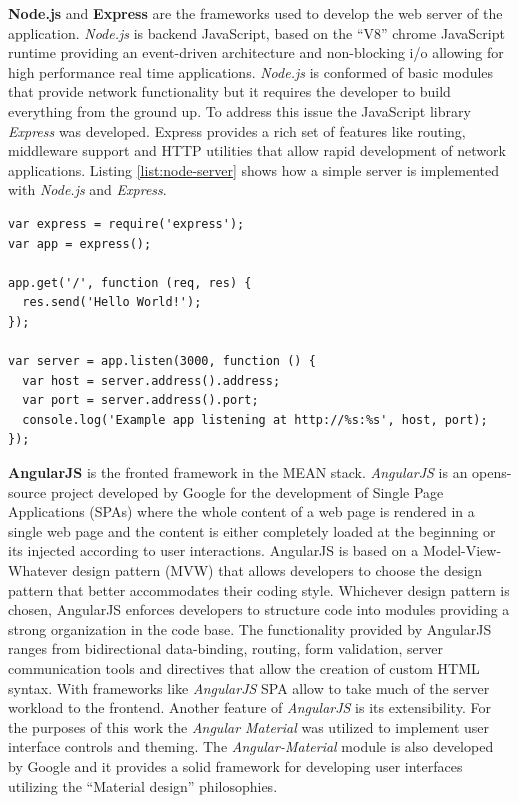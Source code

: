 \documentclass[../medieninformatik-arbeit.tex]{subfiles}
\begin{document}
\textbf{Node.js}\cite{joyent2015node} and \textbf{Express}\cite{express} are the frameworks used to develop the web server of the application. \textit{Node.js} is backend JavaScript, based on the ``V8'' chrome JavaScript runtime providing an event-driven architecture and non-blocking i/o allowing for high performance real time applications. \textit{Node.js} is conformed of basic modules that provide network functionality but it requires the developer to build everything from the ground up. To address this issue the JavaScript library \textit{Express} was developed. Express provides a rich set of features like routing, middleware support and HTTP utilities that allow rapid development of network applications. Listing \ref{list:node-server} shows how a simple server is implemented with \textit{Node.js} and \textit{Express}.

\begin{lstlisting}[style=htmlcssjs, caption={Basic \textit{Node.js} and \textit{Express} server example},label=list:node-server]
var express = require('express');
var app = express();

app.get('/', function (req, res) {
  res.send('Hello World!');
});

var server = app.listen(3000, function () {
  var host = server.address().address;
  var port = server.address().port;
  console.log('Example app listening at http://%s:%s', host, port);
});
\end{lstlisting}

\textbf{AngularJS}\cite{angular} is the fronted framework in the MEAN stack. \textit{AngularJS} is an opens-source project developed by Google for the development of Single Page Applications (SPAs) where the whole content of a web page is rendered in a single web page and the content is either completely loaded at the beginning or its injected according to user interactions. AngularJS is based on a Model-View-Whatever design pattern (MVW) that allows developers to choose the design pattern that better accommodates their coding style. Whichever design pattern is chosen, AngularJS enforces developers to structure code into modules providing a strong organization in the code base. The functionality provided by AngularJS ranges from bidirectional data-binding, routing, form validation, server communication tools and directives that allow the creation of custom HTML syntax. With frameworks like \textit{AngularJS} SPA allow to take much of the server workload to the frontend. Another feature of \textit{AngularJS} is its extensibility. For the purposes of this work the \textit{Angular Material}\cite{angularmaterial} was utilized to implement user interface controls and theming. The \textit{Angular-Material} module is also developed by Google and it provides a solid framework for developing user interfaces utilizing the ``Material design'' philosophies. 
\end{document}
